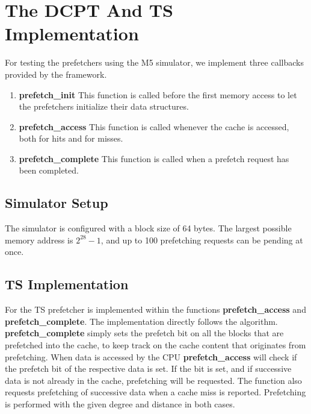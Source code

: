 \section{The DCPT And TS Implementation}

For testing the prefetchers using the M5 simulator, we implement three callbacks
provided by the framework.

\begin{enumerate}
	\item \textbf{prefetch\_init}
		This function is called before the first memory access to let the
		prefetchers initialize their data structures.
	\item \textbf{prefetch\_access}
		This function is called whenever the cache is accessed, both for hits
		and for misses.
	\item \textbf{prefetch\_complete}
		This function is called when a prefetch request has been completed.
\end{enumerate}

\subsection{Simulator Setup}


The simulator is configured with a block size of 64 bytes. The largest possible
memory address is $2^{28}-1$, and up to 100 prefetching requests can be pending
at once.

\subsection{TS Implementation}

For the TS prefetcher is implemented within the functions
\textbf{prefetch\_access} and \textbf{prefetch\_complete}. The 
implementation directly follows the algorithm. 
\textbf{prefetch\_complete} simply sets the prefetch bit on all the 
blocks that are prefetched into the cache, to keep track on the cache content 
that originates from prefetching. When data is accessed by the CPU 
\textbf{prefetch\_access} will check if the 
prefetch bit of the respective data is set. If the bit is set, and if successive 
data is not already in the cache, prefetching will be requested. 
The function also requests prefetching of successive data when a cache 
miss is reported. Prefetching is performed with the given degree 
and distance in both cases.


